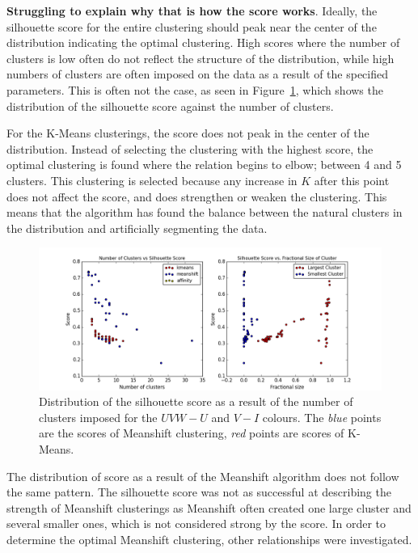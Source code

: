 \textbf{Struggling to explain why that is how the score works}. 
Ideally, the silhouette score for the entire clustering should peak near the center of the distribution indicating the optimal clustering. 
High scores where the number of clusters is low often do not reflect the structure of the distribution, while high numbers of clusters are often imposed on the data as a result of the specified parameters.
This is often not the case, as seen in Figure~\ref{fig:sscore}, which shows the distribution of the silhouette score against the number of clusters.

For the K-Means clusterings, the score does not peak in the center of the distribution.
Instead of selecting the clustering with the highest score, the optimal clustering is found where the relation begins to elbow; between 4 and 5 clusters.
This clustering is selected because any increase in $K$ after this point does not affect the score, and does strengthen or weaken the clustering.
This means that the algorithm has found the balance between the natural clusters in the distribution and artificially segmenting the data.

\begin{figure}[H]
\centering
\includegraphics[width=\linewidth]{figs/methods/silhouette_score_relation}
\caption{Distribution of the silhouette score as a result of the number of clusters imposed for the $UVW - U$ and $V - I$ colours. The \textit{blue} points are the scores of Meanshift clustering, \textit{red} points are scores of K-Means.}
\label{fig:sscore}
\end{figure}

The distribution of score as a result of the Meanshift algorithm does not follow the same pattern.
The silhouette score was not as successful at describing the strength of Meanshift clusterings as Meanshift often created one large cluster and several smaller ones, which is not considered strong by the score.
In order to determine the optimal Meanshift clustering, other relationships were investigated.

